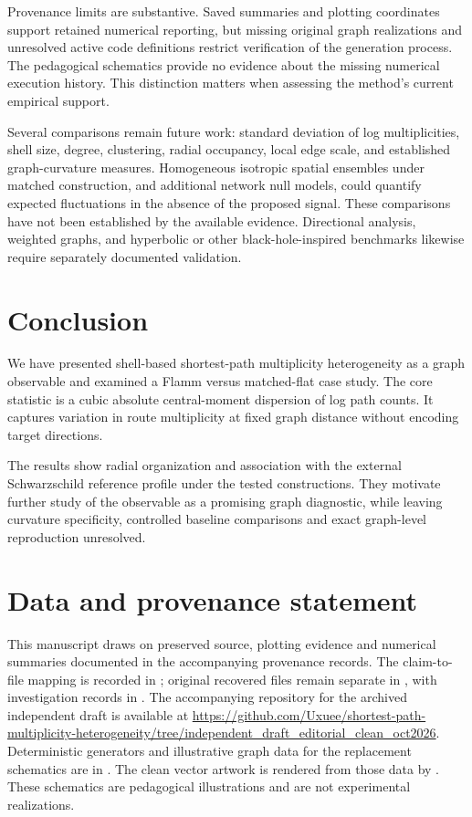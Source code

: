 \documentclass[11pt,a4paper]{article}
\begin{document}
Provenance limits are substantive. Saved summaries and plotting coordinates support retained numerical reporting, but missing original graph realizations and unresolved active code definitions restrict verification of the generation process. The pedagogical schematics provide no evidence about the missing numerical execution history. This distinction matters when assessing the method's current empirical support.

Several comparisons remain future work: standard deviation of log multiplicities, shell size, degree, clustering, radial occupancy, local edge scale, and established graph-curvature measures. Homogeneous isotropic spatial ensembles under matched construction, and additional network null models, could quantify expected fluctuations in the absence of the proposed signal. These comparisons have not been established by the available evidence. Directional analysis, weighted graphs, and hyperbolic or other black-hole-inspired benchmarks likewise require separately documented validation.

\section{Conclusion}
We have presented shell-based shortest-path multiplicity heterogeneity as a graph observable and examined a Flamm versus matched-flat case study. The core statistic is a cubic absolute central-moment dispersion of log path counts. It captures variation in route multiplicity at fixed graph distance without encoding target directions.

The results show radial organization and association with the external Schwarzschild reference profile under the tested constructions. They motivate further study of the observable as a promising graph diagnostic, while leaving curvature specificity, controlled baseline comparisons and exact graph-level reproduction unresolved.

\section*{Data and provenance statement}
This manuscript draws on preserved source, plotting evidence and numerical summaries documented in the accompanying provenance records. The claim-to-file mapping is recorded in ; original recovered files remain separate in , with investigation records in . The accompanying repository for the archived independent draft is available at \url{https://github.com/Uxuee/shortest-path-multiplicity-heterogeneity/tree/independent_draft_editorial_clean_oct2026}. Deterministic generators and illustrative graph data for the replacement schematics are in . The clean vector artwork is rendered from those data by . These schematics are pedagogical illustrations and are not experimental realizations.
\end{document}
